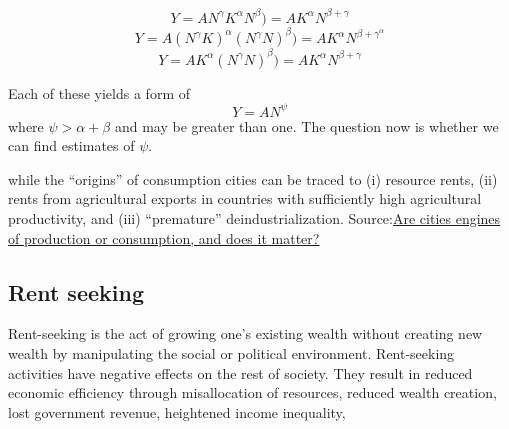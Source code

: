 \[Y = AN^\gamma K^\alpha N^\beta)= AK^\alpha N^{\beta+\gamma}\]
\[Y = A (N^\gamma K)^\alpha (N^\gamma N)^\beta)= AK^\alpha N^{\beta+\gamma^\alpha}\]
\[Y = A K^\alpha (N^\gamma N)^\beta)= AK^\alpha N^{\beta+\gamma}\]

Each of these yields a form of
\[Y = AN^\psi\]
where $\psi> \alpha +\beta$ and may be greater than one. 
The question now is whether we can find estimates of $\psi$.


\vspace{2cm}


\color{black}





\color{green}
while the “origins” of consumption cities can be traced to (i)
resource rents, (ii) rents from agricultural exports in countries with sufficiently high agricultural productivity, and (iii) “premature” deindustrialization.  Source:\href{https://www.brookings.edu/blog/future-development/2022/07/14/1622441/}{Are cities engines of production or consumption, and does it matter?}








\subsection{Rent seeking}
  Rent-seeking is the act of growing one's existing wealth without creating new wealth by manipulating the social or political environment. Rent-seeking activities have negative effects on the rest of society. They result in reduced economic efficiency through misallocation of resources, reduced wealth creation, lost government revenue, heightened income inequality,


\color{black}